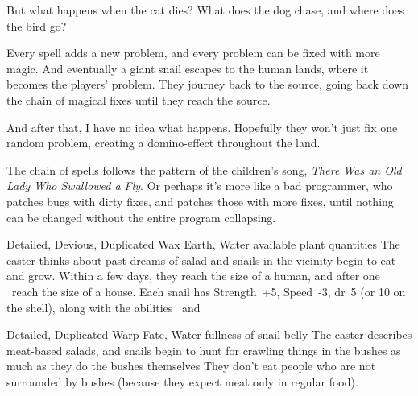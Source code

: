 But what happens when the cat dies?
What does the dog chase, and where does the bird go?

Every spell adds a new problem, and every problem can be fixed with more magic.
And eventually a giant snail escapes to the human lands, where it becomes the players' problem.
They journey back to the source, going back down the chain of magical fixes until they reach the source.

And after that, I have no idea what happens.
Hopefully they won't just fix one random problem, creating a domino-effect throughout the land.

The chain of spells follows the pattern of the children's song, \textit{There Was an Old Lady Who Swallowed a Fly}.
Or perhaps it's more like a bad programmer, who patches bugs with dirty fixes, and patches those with more fixes, until nothing can be changed without the entire program collapsing.


  {Detailed, Devious, Duplicated}%
  {Wax}%
  {Earth, Water}%
  {available plant quantities}%
  {The caster thinks about past dreams of salad and  snails in the vicinity begin to eat and grow.
  Within a few days, they reach the size of a human, and after one \showOnset\ reach the size of a house.
  Each snail has Strength~+5, Speed~-3, \gls{dr}~5 (or 10 on the shell), along with the abilities \viscid\ and \acidSpray}%
  {}

  {Detailed, Duplicated}%
  {Warp}%
  {Fate, Water}%
  {fullness of snail belly}%
  {The caster describes meat-based salads, and  snails begin to hunt for crawling things in the bushes as much as they do the bushes themselves}%
  {They don't eat people who are not surrounded by bushes (because they expect meat only in regular food).}



